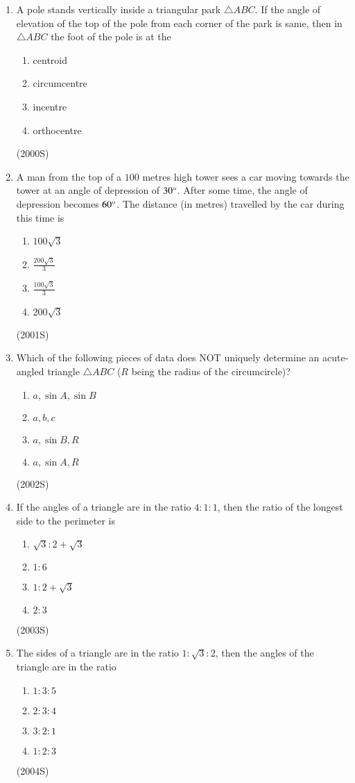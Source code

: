 \documentclass[journal,12pt,twocolumn]{IEEEtran}
\theoremstyle{remark}
\begin{document}
\begin{enumerate}
\item A pole stands vertically inside a triangular park $\triangle ABC$. If the angle of elevation of the top of the pole from each corner of the park is same, then in $\triangle ABC$ the foot of the pole is at the
\begin{enumerate}
\item centroid
\item circumcentre
\item incentre
\item orthocentre
\end{enumerate}
\hfill (2000S)

\item A man from the top of a $100$ metres high tower sees a car moving towards the tower at an angle of depression of $30\degree$. After some time, the angle of depression becomes $60\degree$. The distance (in metres) travelled by the car during this time is
\begin{enumerate}
\item $100\sqrt{3}$
\item $\frac{200\sqrt{3}}{3}$
\item $\frac{100\sqrt{3}}{3}$
\item $200\sqrt{3}$
\end{enumerate}
\hfill (2001S)

\item Which of the following pieces of data does NOT uniquely determine an acute-angled triangle $\triangle ABC$ ($R$ being the radius of the circumcircle)?
\begin{enumerate}
\item $a, \sin A, \sin B$
\item $a, b, c$
\item $a, \sin B, R$
\item $a, \sin A, R$
\end{enumerate}
\hfill (2002S)

\item If the angles of a triangle are in the ratio $4:1:1$, then the ratio of the longest side to the perimeter is
\begin{enumerate}
\item $\sqrt{3}:2+\sqrt{3}$
\item $1:6$
\item $1:2+\sqrt{3}$
\item $2:3$
\end{enumerate}
\hfill (2003S)

\item The sides of a triangle are in the ratio $1:\sqrt{3}:2$, then the angles of the triangle are in the ratio
\begin{enumerate}
\item $1:3:5$
\item $2:3:4$
\item $3:2:1$
\item $1:2:3$
\end{enumerate}
\hfill (2004S)


\end{enumerate}
\end{document}
